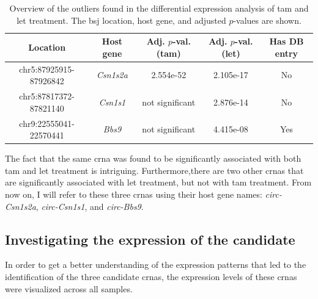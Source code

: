 \begin{table}[H] \centering \begin{tabular}{ccccc} \hline Location   &
               Host gene
                                         & Adj. $p$-val. (\gls{tam})
                                         &
               Adj. $p$-val. (\gls{let}) & Has DB entry
               \\ \hline
               chr5:87925915-87926842    & \textit{Csn1s2a}
                                         &
               2.554e-52
                                         & 2.105e-17
                                         & No
               \\
               chr5:87817372-87821140    & \textit{Csn1s1}
                                         & not
               significant               & 2.876e-14
                                         & No
               \\
               chr9:22555041-22570441    & \textit{Bbs9}
                                         & not
               significant               & 4.415e-08
                                         & Yes
               \\
               \hline
    \end{tabular} \caption{Overview of the outliers found in the differential
        expression analysis of \gls{tam} and \gls{let} treatment.
        The \gls{bsj} location, host gene, and adjusted $p$-values are shown.
    }
    \label{tab:outliers}
\end{table}

The fact that the same \gls{crna} was found to be significantly associated with
both \gls{tam} and \gls{let} treatment is intriguing.
Furthermore,there are two other \glspl{crna} that are significantly associated
with \gls{let} treatment, but not with \gls{tam} treatment.
From now on, I will refer to these three \glspl{crna} using their host gene
names: \textit{circ-Csn1s2a}, \textit{circ-Csn1s1}, and \textit{circ-Bbs9}.

\subsection{Investigating the expression of the candidate }

In order to get a better understanding of the expression patterns that led to
the identification of the three candidate \glspl{crna}, the expression levels
of these \glspl{crna} were visualized across all samples.

